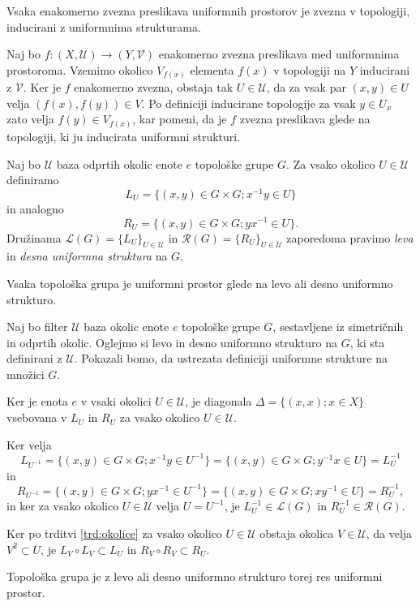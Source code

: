 \documentclass[mat1]{fmfdelo}
\newcommand{\Ucurl}{\mathcal{U}}
\begin{document}
\begin{trditev}\label{trd:enakzveznazvezna}
	Vsaka enakomerno zvezna preslikava uniformnih prostorov je zvezna v topologiji, inducirani z uniformnima strukturama.
\end{trditev}

\begin{dokaz}
	Naj bo $f\colon (X, \mathcal{U}) \to (Y, \mathcal{V})$ enakomerno zvezna preslikava med uniformnima prostoroma. Vzemimo okolico $V_{f(x)}$ elementa $f(x)$ v topologiji na $Y$ inducirani z $\mathcal{V}$. Ker je $f$ enakomerno zvezna, obstaja tak $U \in \mathcal{U}$, da za vsak par $(x, y) \in U$ velja $(f(x), f(y)) \in V$. Po definiciji inducirane topologije za vsak $y \in U_x$ zato velja $f(y) \in V_{f(x)}$, kar pomeni, da je $f$ zvezna preslikava glede na topologiji, ki ju inducirata uniformni strukturi.
\end{dokaz}

\begin{definicija}\label{def:levadesnauni}
	Naj bo $\Ucurl$ baza odprtih okolic enote $e$ topološke grupe $G$. Za vsako okolico $U \in \Ucurl$ definiramo \[L_U = \lbrace (x, y) \in G \times G ; x^{-1}y \in U \rbrace\] in analogno \[R_U = \lbrace (x, y) \in G \times G ; yx^{-1} \in U \rbrace.\] Družinama $\mathcal{L}(G) = \lbrace L_U \rbrace_{U \in \Ucurl}$ in $\mathcal{R}(G) = \lbrace R_U \rbrace_{U \in \Ucurl}$ zaporedoma pravimo \emph{leva} in \emph{desna uniformna struktura} na $G$.
\end{definicija}

\begin{trditev}\label{trd:topguniform}
	Vsaka topološka grupa je uniformni prostor glede na levo ali desno uniformno strukturo.
\end{trditev}

\begin{dokaz}
Naj bo filter $\Ucurl$ baza okolic enote $e$ topološke grupe $G$, sestavljene iz simetričnih in odprtih okolic. Oglejmo si levo in desno uniformno strukturo na $G$, ki sta definirani z $\Ucurl$. Pokazali bomo, da ustrezata definiciji uniformne strukture na množici $G$.

Ker je enota $e$ v vsaki okolici $U \in \Ucurl$, je diagonala $\Delta = \lbrace (x, x) ; x \in X \rbrace$ vsebovana v $L_U$ in $R_U$ za vsako okolico $U \in \Ucurl$.

Ker velja \[L_{U^{-1}} = \lbrace (x, y) \in G \times G ; x^{-1}y \in U^{-1} \rbrace = \lbrace (x, y) \in G \times G ; y^{-1}x \in U \rbrace = L^{-1}_U\]
in
\[R_{U^{-1}} = \lbrace (x, y) \in G \times G ; yx^{-1} \in U^{-1} \rbrace = \lbrace (x, y) \in G \times G ; xy^{-1} \in U \rbrace = R^{-1}_U,\]
in ker za vsako okolico $U \in \Ucurl$ velja $U = U^{-1}$, je $L^{-1}_U \in \mathcal{L}(G)$ in $R^{-1}_U \in \mathcal{R}(G)$.

Ker po trditvi \ref{trd:okolice} za vsako okolico $U \in \Ucurl$ obstaja okolica $V \in \Ucurl$, da velja $V^2 \subset U$, je $L_V \circ L_V \subset L_U$ in $R_V \circ R_V \subset R_U$.

Topološka grupa je z levo ali desno uniformno strukturo torej res uniformni prostor.
\end{dokaz}
\end{document}
